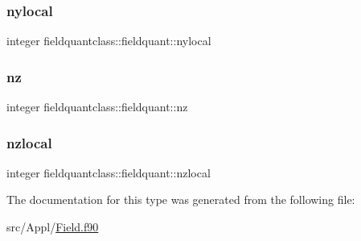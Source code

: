 \subsubsection{\texorpdfstring{nylocal}{nylocal}}
{\footnotesize\ttfamily integer fieldquantclass\+::fieldquant\+::nylocal}

\mbox{\label{structfieldquantclass_1_1fieldquant_a6f78161e325887e087580ad729a35d0b}} 
\subsubsection{\texorpdfstring{nz}{nz}}
{\footnotesize\ttfamily integer fieldquantclass\+::fieldquant\+::nz}

\mbox{\label{structfieldquantclass_1_1fieldquant_aa91a76fdf699b94c32a92a2b2fa2451d}} 
\subsubsection{\texorpdfstring{nzlocal}{nzlocal}}
{\footnotesize\ttfamily integer fieldquantclass\+::fieldquant\+::nzlocal}



The documentation for this type was generated from the following file\+:\begin{DoxyCompactItemize}
\item 
src/\+Appl/\mbox{\hyperlink{_field_8f90}{Field.\+f90}}\end{DoxyCompactItemize}
